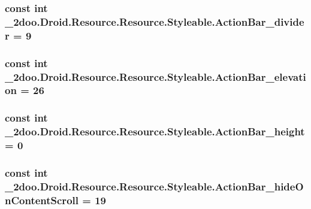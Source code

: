\hypertarget{class__2doo_1_1_droid_1_1_resource_1_1_styleable_85026eec0d477c059dbe790d64e574d2}{
\subsubsection[{ActionBar\_\-divider}]{\setlength{\rightskip}{0pt plus 5cm}const int \_\-2doo.Droid.Resource.Resource.Styleable.ActionBar\_\-divider = 9}}
\label{class__2doo_1_1_droid_1_1_resource_1_1_styleable_85026eec0d477c059dbe790d64e574d2}


\hypertarget{class__2doo_1_1_droid_1_1_resource_1_1_styleable_0c6ae6c14a7c0f3142c11344114beec0}{
\subsubsection[{ActionBar\_\-elevation}]{\setlength{\rightskip}{0pt plus 5cm}const int \_\-2doo.Droid.Resource.Resource.Styleable.ActionBar\_\-elevation = 26}}
\label{class__2doo_1_1_droid_1_1_resource_1_1_styleable_0c6ae6c14a7c0f3142c11344114beec0}


\hypertarget{class__2doo_1_1_droid_1_1_resource_1_1_styleable_e8aef7273684f182d40a62dc5e974d11}{
\subsubsection[{ActionBar\_\-height}]{\setlength{\rightskip}{0pt plus 5cm}const int \_\-2doo.Droid.Resource.Resource.Styleable.ActionBar\_\-height = 0}}
\label{class__2doo_1_1_droid_1_1_resource_1_1_styleable_e8aef7273684f182d40a62dc5e974d11}


\hypertarget{class__2doo_1_1_droid_1_1_resource_1_1_styleable_ef553ba76209839ffb5a48bad8b56d21}{
\subsubsection[{ActionBar\_\-hideOnContentScroll}]{\setlength{\rightskip}{0pt plus 5cm}const int \_\-2doo.Droid.Resource.Resource.Styleable.ActionBar\_\-hideOnContentScroll = 19}}
\label{class__2doo_1_1_droid_1_1_resource_1_1_styleable_ef553ba76209839ffb5a48bad8b56d21}


